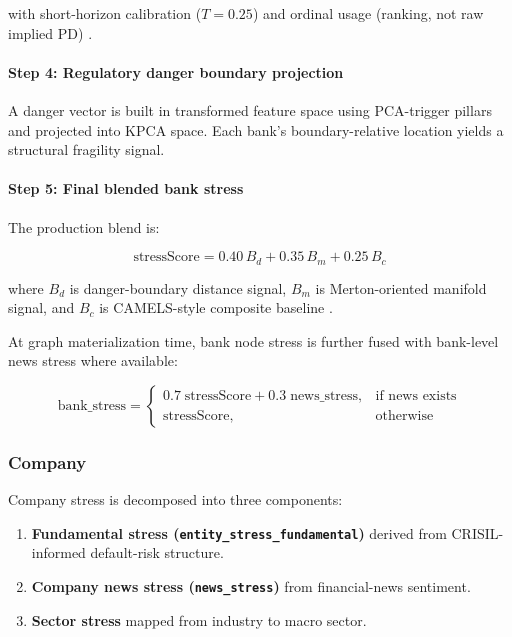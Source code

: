 with short-horizon calibration ($T=0.25$) and ordinal usage (ranking, not raw implied PD) \cite{ref9}.

\paragraph{Step 4: Regulatory danger boundary projection}
A danger vector is built in transformed feature space using PCA-trigger pillars and projected into KPCA space. Each bank's boundary-relative location yields a structural fragility signal.

\paragraph{Step 5: Final blended bank stress}
The production blend is:

\begin{equation}
  \text{stressScore} = 0.40\,B_d + 0.35\,B_m + 0.25\,B_c
\end{equation}

where $B_d$ is danger-boundary distance signal, $B_m$ is Merton-oriented manifold signal, and $B_c$ is CAMELS-style composite baseline \cite{ref8}.

At graph materialization time, bank node stress is further fused with bank-level news stress where available:

\begin{equation}
  \text{bank\_stress} =
  \begin{cases}
    0.7\;\text{stressScore} + 0.3\;\text{news\_stress}, & \text{if news exists}\\
    \text{stressScore},                                   & \text{otherwise}
  \end{cases}
\end{equation}

\cite{ref10}

\subsubsection{Company}

Company stress is decomposed into three components:

\begin{enumerate}
  \item \textbf{Fundamental stress (\texttt{entity\_stress\_fundamental})} derived from CRISIL-informed default-risk structure.
  \item \textbf{Company news stress (\texttt{news\_stress})} from financial-news sentiment.
  \item \textbf{Sector stress} mapped from industry to macro sector.
\end{enumerate}

